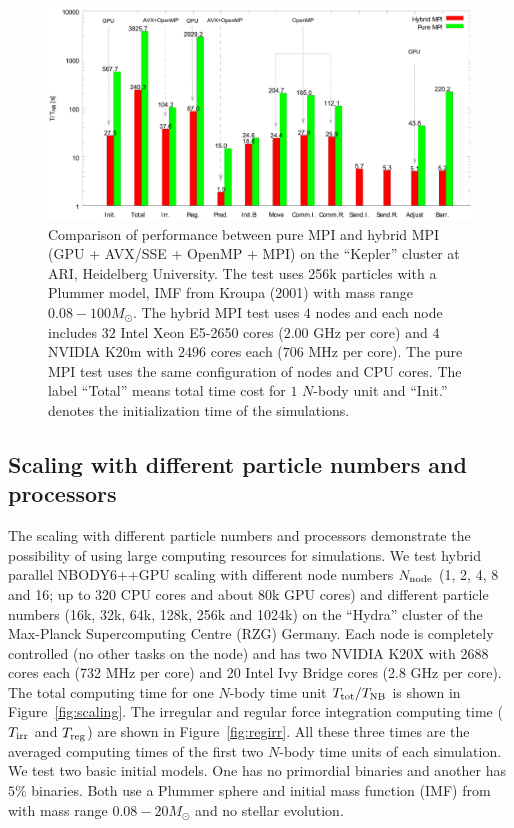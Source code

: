 \documentclass[usenatbib,aas_macros]{mn2e}
\def\nbodyppgpu{NBODY6++GPU }
\def\nb{$N$-body }
\begin{document}
\begin{figure}
  \centering
  \includegraphics[width=1.0\textwidth,height=!]{mpivshyd.eps}
  \caption{Comparison of performance between pure MPI and hybrid MPI (GPU + AVX/SSE + OpenMP + MPI) on the ``Kepler'' cluster at ARI, Heidelberg University. 
    The test uses 256k particles with a Plummer model, IMF from Kroupa (2001) with mass range $0.08 - 100 M_\odot$. 
    The hybrid MPI test uses $4$ nodes and each node includes $32$ Intel Xeon E5-2650 cores ($2.00$ GHz per core) and $4$ NVIDIA K20m with $2496$ cores each ($706$ MHz per core). 
    The pure MPI test uses the same configuration of nodes and CPU cores. 
    The label ``Total'' means total time cost for $1$ \nb unit and ``Init.'' denotes the initialization time of the simulations. }
  \label{fig:mpivshybrid}
\end{figure}

\subsection{Scaling with different particle numbers and processors}
\label{sec:scale}
The scaling with different particle numbers and processors demonstrate the possibility of using large computing resources for simulations. 
We test hybrid parallel \nbodyppgpu scaling with different node numbers $N_{\rm node}$ (1, 2, 4, 8 and 16; up to 320 CPU cores and about 80k GPU cores) and different particle numbers (16k, 32k, 64k, 128k, 256k and 1024k) on the ``Hydra'' cluster of the Max-Planck Supercomputing Centre (RZG) Germany.
Each node is completely controlled (no other tasks on the node) and has two NVIDIA K20X with 2688 cores each (732 MHz per core) and 20 Intel Ivy Bridge cores (2.8 GHz per core). 
The total computing time for one \nb time unit $T_{\rm tot}/T_{\rm NB}$ is shown in Figure~\ref{fig:scaling}.
The irregular and regular force integration computing time ($T_{\rm irr}$ and $T_{\rm reg}$) are shown in Figure~\ref{fig:regirr}. 
All these three times are the averaged computing times of the first two \nb time units of each simulation.
We test two basic initial models. 
One has no primordial binaries and another has $5\%$ binaries. 
Both use a Plummer sphere \citep{Plummer1911} and initial mass function (IMF) from \cite{Kroupa1993} with mass range $0.08-20 M_\odot$ and no stellar evolution. 
\end{document}
